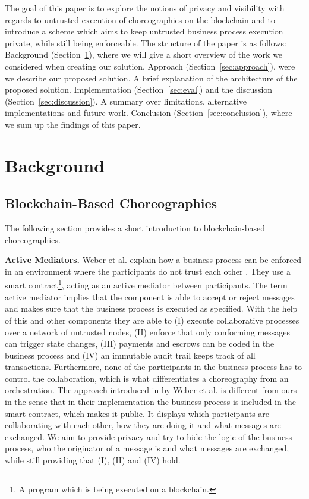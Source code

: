 \documentclass[runningheads]{llncs}
\newcommand{\refsec}[1]{Section~\ref{#1}}
\begin{document}
The goal of this paper is to explore the notions of privacy and visibility with regards to untrusted execution of choreographies on the blockchain and to introduce a scheme which aims to keep untrusted business process execution private, while still being enforceable. The structure of the paper is as follows: Background (\refsec{sec:background}), where we will give a short overview of the work we considered when creating our solution. Approach (\refsec{sec:approach}), were we  describe our proposed solution. A brief explanation of the architecture of the proposed solution. Implementation (\refsec{sec:eval}) and the discussion (\refsec{sec:discussion}). A summary over limitations, alternative implementations and future work. Conclusion (\refsec{sec:conclusion}), where we sum up the findings of this paper.

\section{Background} \label{sec:background}

\subsection{Blockchain-Based Choreographies} \label{subsec:blockchainbased}

The following section provides a short introduction to blockchain-based choreographies. 

\textbf{Active Mediators.} Weber et al. explain how a business process can be enforced in an environment where the participants do not trust each other \cite{weber2016untrusted}. They use a smart contract\footnote{A program which is being executed on a blockchain.}, acting as an active mediator between participants. The term active mediator implies that the component is able to accept or reject messages and makes sure that the business process is executed as specified. With the help of this and other components they are able to (I) execute collaborative processes over a network of untrusted nodes, (II) enforce that only conforming messages can trigger state changes, (III) payments and escrows can be coded in the business process and (IV) an immutable audit trail keeps track of all transactions. Furthermore, none of the participants in the business process has to control the collaboration, which is what differentiates a choreography from an orchestration. The approach introduced in by Weber et al. is different from ours in the sense that in their implementation the business process is included in the smart contract, which makes it public. It displays which participants are collaborating with each other, how they are doing it and what messages are exchanged. We aim to provide privacy and try to hide the logic of the business process, who the originator of a message is  and what messages are exchanged, while still providing that (I), (II) and (IV) hold.
\end{document}
